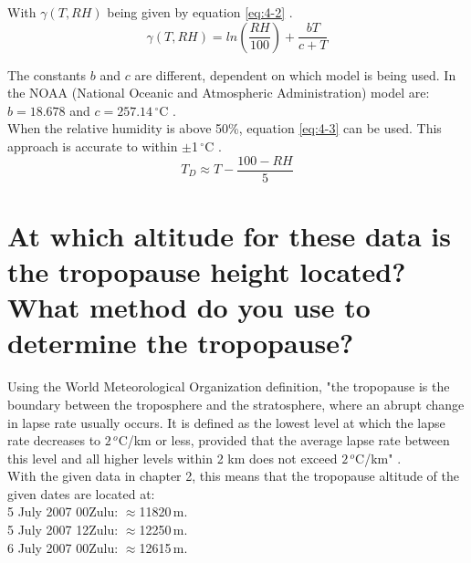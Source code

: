\documentclass{article}
\begin{document}
With $\gamma (T, RH)$ being given by equation \ref{eq:4-2} \cite{wikiQ4}.
\begin{equation}
\gamma (T, RH) = ln \left( \frac{RH}{100} \right) + \frac{bT}{c + T} \label{eq:4-2}
\end{equation}

The constants $b$ and $c$ are different, dependent on which model is being used. In the NOAA (National Oceanic and Atmospheric Administration) model are: $b = 18.678$ and $c = 257.14$\,$^\circ$C \cite{wikiQ4}.\\

When the relative humidity is above 50\%, equation \ref{eq:4-3} can be used. This approach is accurate to within $\pm$1\,$^\circ$C \cite{wikiQ4}.
\begin{equation}
T_D \approx T - \frac{100 - RH}{5} \label{eq:4-3}
\end{equation}



\newpage
\section{At which altitude for these data is the tropopause height located?What method do you use to determine the tropopause?}
Using the World Meteorological Organization definition, "the tropopause is the boundary between the troposphere and the stratosphere, where an abrupt change in lapse rate usually occurs. It is defined as the lowest level at which the lapse rate decreases to $2\,^{o}$C/km or less, provided that the average lapse rate between this level and all higher levels within 2 km does not exceed $2\,^{o}$C/km" \cite{wikiQ5}.\\


With the given data in chapter 2, this means that the tropopause altitude of the given dates are located at:\\
5 July 2007 00Zulu: $\approx$11820\,m.\\
5 July 2007 12Zulu: $\approx$12250\,m.\\
6 July 2007 00Zulu: $\approx$12615\,m.\\

\newpage
\end{document}
